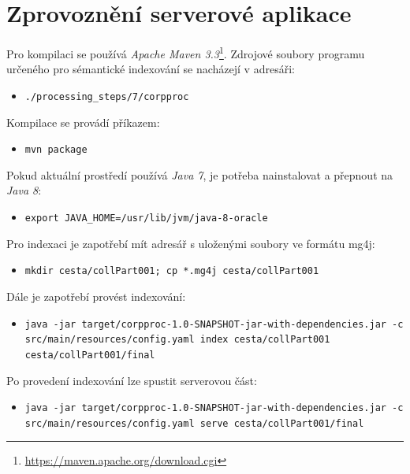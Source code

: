 \section{Zprovoznění serverové aplikace}
Pro kompilaci se používá  \emph{Apache Maven 3.3}\footnote{\href{https://maven.apache.org/download.cgi}{https://maven.apache.org/download.cgi}}. Zdrojové soubory programu určeného pro sémantické indexování se nacházejí v adresáři:
\begin{itemize}
\item \texttt{./processing\_steps/7/corpproc}
\end{itemize}
Kompilace se provádí příkazem:
\begin{itemize}
\item \texttt{mvn package}
\end{itemize}
Pokud aktuální prostředí používá \emph{Java 7}, je potřeba nainstalovat a přepnout na \emph{Java 8}:
\begin{itemize}
\item \texttt{export JAVA\_HOME=/usr/lib/jvm/java-8-oracle}
\end{itemize}
Pro indexaci je zapotřebí mít adresář s uloženými soubory ve formátu mg4j:
\begin{itemize}
\item \texttt{mkdir cesta/collPart001; cp *.mg4j cesta/collPart001}
\end{itemize}
Dále je zapotřebí provést indexování:
\begin{itemize}
\item \texttt{java -jar target/corpproc-1.0-SNAPSHOT-jar-with-dependencies.jar \hfill \break
-c src/main/resources/config.yaml index cesta/collPart001 \hfill \break cesta/collPart001/final}
\end{itemize}
Po provedení indexování lze spustit serverovou část:
\begin{itemize}
\item \texttt{java -jar target/corpproc-1.0-SNAPSHOT-jar-with-dependencies.jar \hfill \break
-c src/main/resources/config.yaml serve cesta/collPart001/final}
\end{itemize}

